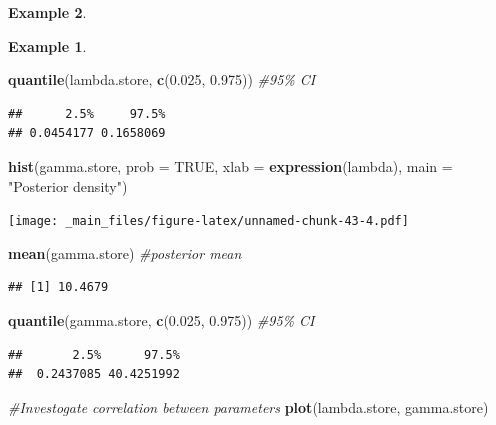 \documentclass[
]{book}
\newenvironment{Shaded}{\begin{snugshade}}{\end{snugshade}}
\newcommand{\AttributeTok}[1]{\textcolor[rgb]{0.13,0.29,0.53}{#1}}
\newcommand{\CommentTok}[1]{\textcolor[rgb]{0.56,0.35,0.01}{\textit{#1}}}
\newcommand{\ConstantTok}[1]{\textcolor[rgb]{0.56,0.35,0.01}{#1}}
\newcommand{\FloatTok}[1]{\textcolor[rgb]{0.00,0.00,0.81}{#1}}
\newcommand{\FunctionTok}[1]{\textcolor[rgb]{0.13,0.29,0.53}{\textbf{#1}}}
\newcommand{\NormalTok}[1]{#1}
\newcommand{\StringTok}[1]{\textcolor[rgb]{0.31,0.60,0.02}{#1}}
\theoremstyle{definition}
\theoremstyle{definition}
\newtheorem{example}{Example}[chapter]
\theoremstyle{definition}
\theoremstyle{definition}
\theoremstyle{remark}
\begin{document}
\begin{example}
\begin{example}
\begin{Shaded}
\begin{Highlighting}[]
\FunctionTok{quantile}\NormalTok{(lambda.store, }\FunctionTok{c}\NormalTok{(}\FloatTok{0.025}\NormalTok{, }\FloatTok{0.975}\NormalTok{)) }\CommentTok{\#95\% CI}
\end{Highlighting}
\end{Shaded}

\begin{verbatim}
##      2.5%     97.5% 
## 0.0454177 0.1658069
\end{verbatim}

\begin{Shaded}
\begin{Highlighting}[]
\FunctionTok{hist}\NormalTok{(gamma.store, }\AttributeTok{prob =} \ConstantTok{TRUE}\NormalTok{, }\AttributeTok{xlab =} \FunctionTok{expression}\NormalTok{(lambda), }\AttributeTok{main =} \StringTok{"Posterior density"}\NormalTok{)}
\end{Highlighting}
\end{Shaded}

\texttt{[image: \_main\_files/figure-latex/unnamed-chunk-43-4.pdf]}

\begin{Shaded}
\begin{Highlighting}[]
\FunctionTok{mean}\NormalTok{(gamma.store) }\CommentTok{\#posterior mean}
\end{Highlighting}
\end{Shaded}

\begin{verbatim}
## [1] 10.4679
\end{verbatim}

\begin{Shaded}
\begin{Highlighting}[]
\FunctionTok{quantile}\NormalTok{(gamma.store, }\FunctionTok{c}\NormalTok{(}\FloatTok{0.025}\NormalTok{, }\FloatTok{0.975}\NormalTok{)) }\CommentTok{\#95\% CI}
\end{Highlighting}
\end{Shaded}

\begin{verbatim}
##       2.5%      97.5% 
##  0.2437085 40.4251992
\end{verbatim}

\begin{Shaded}
\begin{Highlighting}[]
\CommentTok{\#Investogate correlation between parameters}
\FunctionTok{plot}\NormalTok{(lambda.store, gamma.store)}
\end{Highlighting}
\end{Shaded}


\end{example}
\end{example}
\end{document}
